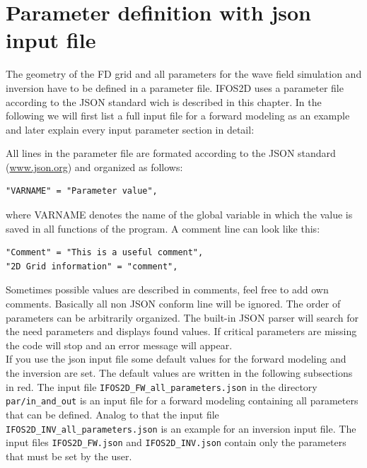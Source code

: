 \chapter{Parameter definition with json input file}
\label{Definition-parameters_json}

The geometry of the FD grid and all parameters for the wave field simulation and inversion have to be defined in a parameter file.
IFOS2D uses a parameter file according to the JSON standard wich is described in this chapter. In the following we will first list a full input file for a forward modeling as an example and later explain every input parameter section in detail:

All lines in the parameter file are formated according to the JSON standard (\href{www.json.org}{www.json.org}) and organized as follows: 
{\color{blue}\begin{verbatim}
"VARNAME" = "Parameter value",
\end{verbatim}}

where VARNAME denotes the name of the global variable in which the value is saved in all functions of the program. A comment line can look like this:

{\color{blue}\begin{verbatim}
"Comment" = "This is a useful comment",
"2D Grid information" = "comment",
\end{verbatim}}

Sometimes possible values are described in comments, feel free to add own comments. Basically all non JSON conform line will be ignored. The order of parameters can be arbitrarily organized. The built-in JSON parser will search for the need parameters and displays found values. If critical parameters are missing the code will stop and an error message will appear.\\

If you use the json input file some default values for the forward modeling and the inversion are set. The default values are written in the following subsections in red. The input file \texttt{IFOS2D\_FW\_all\_parameters.json} in the directory \texttt{par/in\_and\_out} is an input file for a forward modeling containing all parameters that can be defined. Analog to that the input file \texttt{IFOS2D\_INV\_all\_parameters.json} is an example for an inversion input file. The input files \texttt{IFOS2D\_FW.json} and \texttt{IFOS2D\_INV.json} contain only the parameters that must be set by the user.\\


